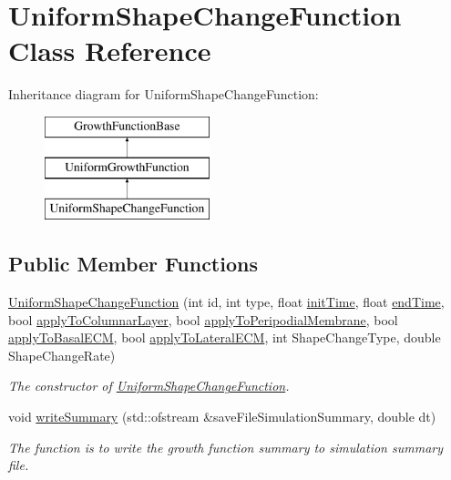 \hypertarget{classUniformShapeChangeFunction}{}\section{Uniform\+Shape\+Change\+Function Class Reference}
\label{classUniformShapeChangeFunction}
Inheritance diagram for Uniform\+Shape\+Change\+Function\+:\begin{figure}[H]
\begin{center}
\leavevmode
\includegraphics[height=3.000000cm]{classUniformShapeChangeFunction}
\end{center}
\end{figure}
\subsection*{Public Member Functions}
\begin{DoxyCompactItemize}
\item 
\hyperlink{classUniformShapeChangeFunction_afa0eddca7000c9f270e4179f0718fd23}{Uniform\+Shape\+Change\+Function} (int id, int type, float \hyperlink{classGrowthFunctionBase_ae92513a7b41637df8e26e7db35ddf97c}{init\+Time}, float \hyperlink{classGrowthFunctionBase_a3ff4db0573d354a75666a5f3ca446941}{end\+Time}, bool \hyperlink{classGrowthFunctionBase_a3d56771e7c145589a14e11cc331e0326}{apply\+To\+Columnar\+Layer}, bool \hyperlink{classGrowthFunctionBase_a08ae19f58cb98fa8e315a77f52749732}{apply\+To\+Peripodial\+Membrane}, bool \hyperlink{classGrowthFunctionBase_a9fe46fc6dde4041b79204beb48972a09}{apply\+To\+Basal\+E\+C\+M}, bool \hyperlink{classGrowthFunctionBase_ac623b1dbe376bce5dddbe1a2e21c776f}{apply\+To\+Lateral\+E\+C\+M}, int Shape\+Change\+Type, double Shape\+Change\+Rate)
\begin{DoxyCompactList}\small\item\em The constructor of \hyperlink{classUniformShapeChangeFunction}{Uniform\+Shape\+Change\+Function}. \end{DoxyCompactList}\item 
void \hyperlink{classUniformShapeChangeFunction_a336ad7754afb58309fd3af82913fab83}{write\+Summary} (std\+::ofstream \&save\+File\+Simulation\+Summary, double dt)
\begin{DoxyCompactList}\small\item\em The function is to write the growth function summary to simulation summary file. \end{DoxyCompactList}\end{DoxyCompactItemize}
